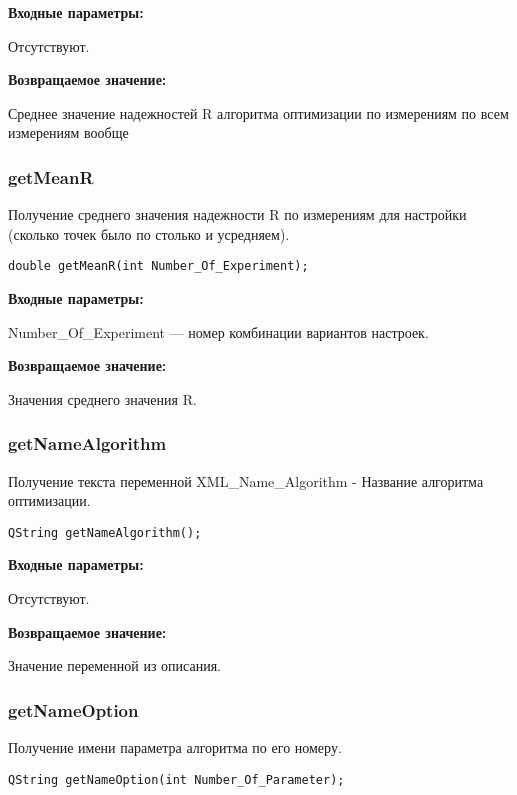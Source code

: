 \documentclass[a4paper,12pt]{article}
\begin{document}
\textbf{Входные параметры:}

Отсутствуют.

\textbf{Возвращаемое значение:}

Среднее значение надежностей R алгоритма оптимизации по измерениям по всем измерениям вообще


\subsubsection{getMeanR}\label{getMeanR}

Получение среднего значения надежности R по измерениям для настройки (сколько точек было по столько и усредняем).


\begin{lstlisting}[label=code_syntax_getMeanR,caption=Синтаксис]
double getMeanR(int Number_Of_Experiment);
\end{lstlisting}

\textbf{Входные параметры:}

Number\_Of\_Experiment --- номер комбинации вариантов настроек.

\textbf{Возвращаемое значение:}

Значения среднего значения R.


\subsubsection{getNameAlgorithm}\label{getNameAlgorithm}

Получение текста переменной  XML\_Name\_Algorithm - Название алгоритма оптимизации.


\begin{lstlisting}[label=code_syntax_getNameAlgorithm,caption=Синтаксис]
QString getNameAlgorithm();
\end{lstlisting}

\textbf{Входные параметры:}

Отсутствуют.

\textbf{Возвращаемое значение:}

Значение переменной из описания.


\subsubsection{getNameOption}\label{getNameOption}

Получение имени параметра алгоритма по его номеру.


\begin{lstlisting}[label=code_syntax_getNameOption,caption=Синтаксис]
QString getNameOption(int Number_Of_Parameter);
\end{lstlisting}
\end{document}
